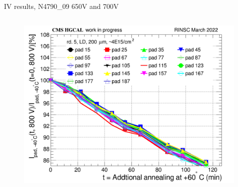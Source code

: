 \documentclass{beamer}
\begin{document}
\begin{frame}{IV results, N4790\_09  650V and 700V}
  \begin{columns}
       \begin{figure}
           \includegraphics[width=1.0\textwidth]{plots/8in_198ch_2019_N4790_21_4E15_neg40degC_annealing_current_800.png}
       \end{figure}
   \end{columns}
\end{frame}
\end{document}
